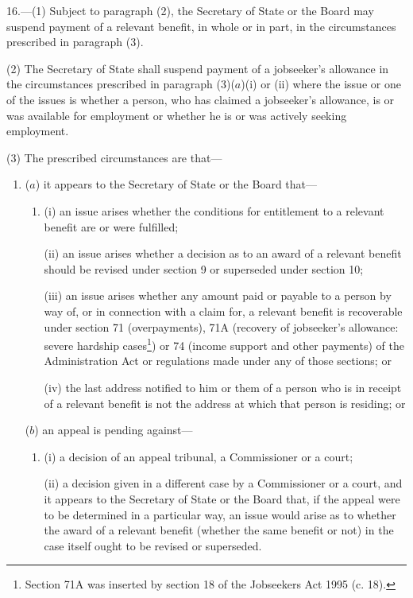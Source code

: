 \documentclass[12pt,a4paper]{article}
\begin{document}
\renewcommand\parthead{--- Part III Chapter I}

16.—(1) Subject to paragraph (2), the Secretary of State 
or the Board  %
may suspend payment of a relevant benefit, in whole or in part, in the circumstances prescribed in paragraph (3).

(2) The Secretary of State shall suspend payment of a jobseeker’s allowance in the circumstances prescribed in paragraph (3)($a$)(i) or (ii) where the issue or one of the issues is whether a person, who has claimed a jobseeker’s allowance, is or was available for employment or whether he is or was actively seeking employment.

(3) The prescribed circumstances are that—
\begin{enumerate}\item[]
($a$) it appears to the Secretary of State 
or the Board  %
that—
\begin{enumerate}\item[]
(i) an issue arises whether the conditions for entitlement to a relevant benefit are or were fulfilled;

(ii) an issue arises whether a decision as to an award of a relevant benefit should be revised under section 9 or superseded under section 10;

(iii) an issue arises whether any amount paid or payable to a person by way of, or in connection with a claim for, a relevant benefit is recoverable under section 71 (overpayments), 71A (recovery of jobseeker’s allowance: severe hardship cases\footnote{\frenchspacing Section 71A was inserted by section 18 of the Jobseekers Act 1995 (c. 18).}) or 74 (income support and other payments) of the Administration Act or regulations made under any of those sections; or

(iv) the last address notified to him 
or them %
of a person who is in receipt of a relevant benefit is not the address at which that person is residing; or
\end{enumerate}

($b$) an appeal is pending against—
\begin{enumerate}\item[]
(i) a decision of an appeal tribunal, a Commissioner or a court;

(ii) a decision given in a different case by a Commissioner or a court, and it appears to the Secretary of State 
or the Board  %
that, if the appeal were to be determined in a particular way, an issue would arise as to whether the award of a relevant benefit (whether the same benefit or not) in the case itself ought to be revised or superseded.
\end{enumerate}
\end{enumerate}
\end{document}
